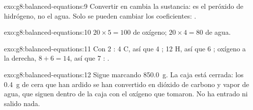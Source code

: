 \begin{solution}{exo:g8:balanced-equations:9}
Convertir  en  cambia la sustancia:  es el
peróxido de hidrógeno, no el agua. Solo se pueden cambiar los
coeficientes:
.
\end{solution}

\begin{solution}{exo:g8:balanced-equations:10}
$20 \times 5 = 100$  de oxígeno; $20 \times 4 = 80$ 
de agua.
\end{solution}

\begin{solution}{exo:g8:balanced-equations:11}
Con 2 : 4 C, así que 4 ; 12 H, así que 6 ;
oxígeno a la derecha, $8 + 6 = 14$, así que 7 :
.
\end{solution}

\begin{solution}{exo:g8:balanced-equations:12}
Sigue marcando \qty{850.0}{g}. La caja está cerrada: los \qty{0.4}{g}
de cera que han ardido se han convertido en dióxido de carbono y vapor
de agua, que siguen dentro de la caja con el oxígeno que tomaron. No ha
entrado ni salido nada.
\end{solution}


